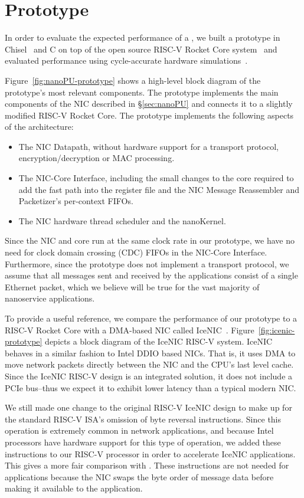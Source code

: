 \section{\name{} Prototype}
\label{sec:prototype}
In order to evaluate the expected performance of a \name{}, we built a prototype in Chisel~\cite{chisel} and C on top of the open source RISC-V Rocket Core system~\cite{rocket-chip} and evaluated performance using cycle-accurate hardware simulations~\cite{verilator}.

Figure~\ref{fig:nanoPU-prototype} shows a high-level block diagram of the prototype's most relevant components.
The prototype implements the main components of the NIC described in \S\ref{sec:nanoPU} and connects it to a slightly modified RISC-V Rocket Core.
The prototype implements the following aspects of the \name{} architecture:
\begin{itemize}
    \item The NIC Datapath, without hardware support for a transport protocol, encryption/decryption or MAC processing.
    \item The NIC-Core Interface, including the small changes to the core required to add the fast path into the register file and the NIC Message Reassembler and Packetizer's per-context FIFOs.
    \item The NIC hardware thread scheduler and the nanoKernel.
\end{itemize}
Since the NIC and core run at the same clock rate in our prototype, we have no need for clock domain crossing (CDC) FIFOs in the NIC-Core Interface.
Furthermore, since the prototype does not implement a transport protocol, we assume that all messages sent and received by the applications consist of a single Ethernet packet, which we believe will be true for the vast majority of nanoservice applications.

To provide a useful reference, we compare the performance of our \name{} prototype to a RISC-V Rocket Core with a DMA-based NIC called IceNIC~\cite{firesim}.
Figure~\ref{fig:icenic-prototype} depicts a block diagram of the IceNIC RISC-V system.
IceNIC behaves in a similar fashion to Intel DDIO based NICs.
That is, it uses DMA to move network packets directly between the NIC and the CPU's last level cache.
Since the IceNIC RISC-V design is an integrated solution, it does not include a PCIe bus--thus we expect it to exhibit lower latency than a typical modern NIC.

We still made one change to the original RISC-V IceNIC design to make up for the standard RISC-V ISA's omission of byte reversal instructions.
Since this operation is extremely common in network applications, and because Intel processors have hardware support for this type of operation, we added these instructions to our RISC-V processor in order to accelerate IceNIC applications. This gives a more fair comparison with \name{}.
These instructions are not needed for \name{} applications because the NIC swaps the byte order of message data before making it available to the application.

